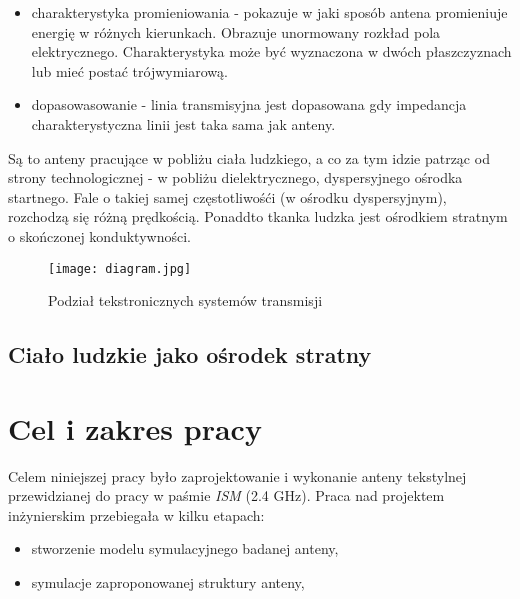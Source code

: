 \begin{itemize}
\begin{itemize}
\begin{itemize}
	\item charakterystyka promieniowania - pokazuje w jaki sposób antena promieniuje energię w różnych kierunkach. Obrazuje unormowany rozkład pola elektrycznego. Charakterystyka może być wyznaczona w dwóch płaszczyznach lub mieć postać trójwymiarową.

	\item dopasowasowanie - linia transmisyjna jest dopasowana gdy impedancja charakterystyczna linii jest taka sama jak anteny. 


\end{itemize}

Są to anteny pracujące w pobliżu ciała ludzkiego, a co za tym idzie patrząc od strony technologicznej - w pobliżu dielektrycznego, dyspersyjnego ośrodka startnego. Fale o takiej samej częstotliwośći (w ośrodku dyspersyjnym), rozchodzą się różną prędkością. 
Ponaddto tkanka ludzka jest ośrodkiem stratnym o skończonej konduktywności.

	\begin{figure}[h!]
	\centering
	    \texttt{[image: diagram.jpg]}
	    \caption{Podział tekstronicznych systemów transmisji}
	\end{figure}


\section{Ciało ludzkie jako ośrodek stratny}












 \chapter{Cel i zakres pracy}

Celem niniejszej pracy było zaprojektowanie i wykonanie anteny tekstylnej przewidzianej do pracy w paśmie \emph{ISM} (2.4 GHz). 
Praca nad projektem inżynierskim przebiegała w kilku etapach:

\begin{itemize}\setlength{\itemsep}{0pt}
	
	\item stworzenie modelu symulacyjnego badanej anteny,

	\item symulacje zaproponowanej struktury anteny,


\end{itemize}
\end{itemize}
\end{itemize}
